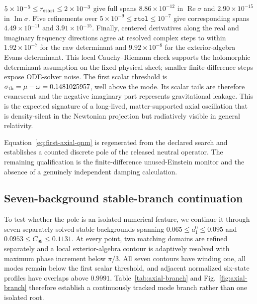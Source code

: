 $5\times10^{-5}\leq r_{\rm start}\leq2\times10^{-3}$ give full spans
$8.86\times10^{-12}$ in $\operatorname{Re}\sigma$ and
$2.90\times10^{-15}$ in $\operatorname{Im}\sigma$. Five refinements over
$5\times10^{-9}\leq\texttt{rtol}\leq10^{-7}$ give corresponding spans
$4.49\times10^{-11}$ and $3.91\times10^{-15}$. Finally, centered derivatives
along the real and imaginary frequency directions agree at resolved complex
steps to within $1.92\times10^{-7}$ for the raw determinant and
$9.92\times10^{-8}$ for the exterior-algebra Evans determinant. This local
Cauchy--Riemann check supports the holomorphic determinant assumption on the
fixed physical sheet; smaller finite-difference steps expose ODE-solver noise.
The first scalar threshold is
$\sigma_{\rm th}=\mu-\omega=0.1481025957$, well above the mode.  Its scalar
tails are therefore evanescent and the negative imaginary part represents
gravitational leakage.  This is the expected signature of a long-lived,
matter-supported axial oscillation that is density-silent in the Newtonian
projection but radiatively visible in general relativity.

Equation~\eqref{eq:first-axial-qnm} is regenerated from the declared search
and establishes a counted discrete pole of the released neutral operator. The
remaining qualification is the finite-difference unused-Einstein monitor and the
absence of a genuinely independent damping calculation.

\subsection{Seven-background stable-branch continuation}

To test whether the pole is an isolated numerical feature, we continue it
through seven separately solved stable backgrounds spanning
$0.065\leq a_1^0\leq0.095$ and $0.0953\leq C_{99}\leq0.1131$. At every point,
two matching domains are refined separately and a local exterior-algebra
contour is adaptively resolved with maximum phase increment below $\pi/3$.
All seven contours have winding one, all modes remain below the first scalar
threshold, and adjacent normalized six-state profiles have overlaps above
$0.9991$. Table~\ref{tab:axial-branch} and Fig.~\ref{fig:axial-branch} therefore
establish a continuously tracked mode branch rather than one isolated root.

